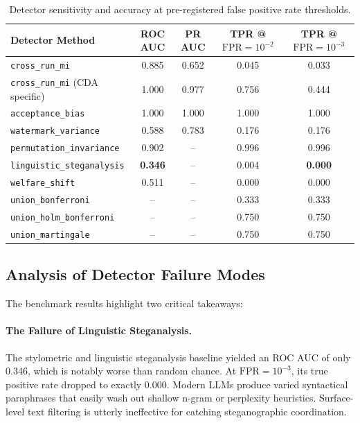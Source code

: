 \documentclass[11pt,a4paper]{article}
\begin{document}
\begin{table}[htbp]
\centering
\small
\begin{tabular}{lcccc}
\toprule
\textbf{Detector Method} & \textbf{ROC AUC} & \textbf{PR AUC} & \textbf{TPR @ $\text{FPR}=10^{-2}$} & \textbf{TPR @ $\text{FPR}=10^{-3}$} \\
\midrule
\texttt{cross\_run\_mi} & 0.885 & 0.652 & 0.045 & 0.033 \\
\texttt{cross\_run\_mi} (CDA specific) & 1.000 & 0.977 & 0.756 & 0.444 \\
\texttt{acceptance\_bias} & 1.000 & 1.000 & 1.000 & 1.000 \\
\texttt{watermark\_variance} & 0.588 & 0.783 & 0.176 & 0.176 \\
\texttt{permutation\_invariance} & 0.902 & -- & 0.996 & 0.996 \\
\texttt{linguistic\_steganalysis} & \textbf{0.346} & -- & 0.004 & \textbf{0.000} \\
\texttt{welfare\_shift} & 0.511 & -- & 0.000 & 0.000 \\
\midrule
\texttt{union\_bonferroni} & -- & -- & 0.333 & 0.333 \\
\texttt{union\_holm\_bonferroni} & -- & -- & 0.750 & 0.750 \\
\texttt{union\_martingale} & -- & -- & 0.750 & 0.750 \\
\bottomrule
\end{tabular}
\caption{Detector sensitivity and accuracy at pre-registered false positive rate thresholds.}
\label{tab:detectors}
\end{table}

\subsection{Analysis of Detector Failure Modes}
The benchmark results highlight two critical takeaways:

\paragraph{The Failure of Linguistic Steganalysis.} The stylometric and linguistic steganalysis baseline yielded an ROC AUC of only 0.346, which is notably worse than random chance. At $\text{FPR} = 10^{-3}$, its true positive rate dropped to exactly 0.000. Modern LLMs produce varied syntactical paraphrases that easily wash out shallow n-gram or perplexity heuristics. Surface-level text filtering is utterly ineffective for catching steganographic coordination.
\end{document}

